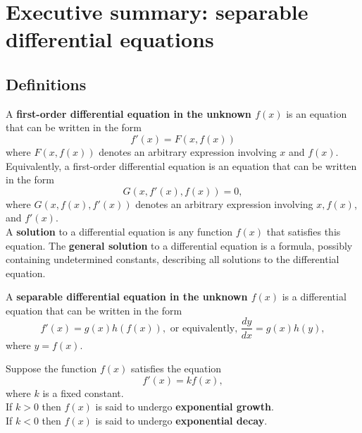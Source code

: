 \newpage

\section{Executive summary: separable differential equations}

\thispagestyle{fancy}
\subsection*{Definitions}
\begin{namedtheorem} A {\bf first-order differential equation in the unknown $f(x)$} is an equation that can be written in the form
  \[
  f'(x)=F(x,f(x)) \tag{$*$}
  \]
  where $F(x,f(x))$ denotes an arbitrary expression involving $x$ and $f(x)$. Equivalently, a first-order differential equation is an equation that can be written in the form
  \[
  G(x, f'(x), f(x))=0,
  \]
  where $G(x,f(x), f'(x))$ denotes an arbitrary expression involving $x, f(x)$, and $f'(x)$.
\vspace{.1in}
\\
A {\bf solution} to a differential equation is any function $f(x)$ that satisfies this equation. The {\bf general solution} to a differential equation is a formula, possibly containing undetermined constants, describing all solutions to the differential equation.
\end{namedtheorem}
\begin{namedtheorem}A {\bf separable differential equation in the unknown $f(x)$} is a differential equation that can be written in the form
  \[
  f'(x)=g(x)h(f(x)), \text{ or equivalently,  } \frac{dy}{dx}=g(x)h(y),
  \]
  where $y=f(x)$.

\end{namedtheorem}
\begin{namedtheorem} Suppose the function $f(x)$ satisfies the equation
  \[
 f'(x)=k f(x),
  \]
  where $k$ is a fixed constant.
  \vspace{.1in}
  \\
  If $k>0$ then $f(x)$ is said to undergo {\bf exponential growth}.
  \vspace{.1in}
  \\
  If $k<0$ then $f(x)$ is said to undergo {\bf exponential decay}.

\end{namedtheorem}



